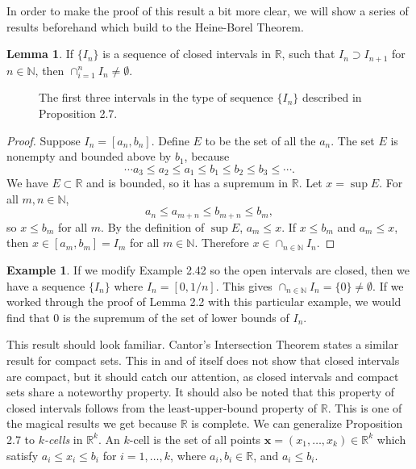 \documentclass{article}
\newcommand{\N}{\mathbb{N}}
\newcommand{\R}{\mathbb{R}}
\newcommand{\x}{\mathbf{x}}
\theoremstyle{definition}
\newtheorem{lemma}{Lemma}[section]
\newtheorem{example}{Example}[section]
\begin{document}
In order to make the proof of this result a bit more clear, we will show a series of results beforehand which build to the Heine-Borel Theorem.
\begin{lemma}
	If $ \{I_n\} $ is a sequence of closed intervals in $ \R $, such that $ I_n\supset I_{n+1} $  for $ n\in\N $, then $ \cap_{i=1}^n I_n\neq\emptyset$.
\end{lemma}  
		\begin{figure}[h]
	\centering
	\caption{The first three intervals in the type of sequence $ \{I_n\} $ described in Proposition 2.7.}
\end{figure}
\begin{proof}
	Suppose $ I_n=[a_n,b_n] $. Define $ E $ to be the set of all the $ a_n $. The set $ E $ is nonempty and bounded above by $ b_1 $, because $$\cdots a_3\le a_2\le a_1\le b_1\le b_2\le b_3\le \cdots .$$ We have $ E\subset \R $ and is bounded, so it has a supremum in $ \R $. Let $ x=\sup E $. For all $ m,n\in\N $, $$a_n\le a_{m+n}\le b_{m+n}\le b_m ,$$ so $ x\le b_m $ for all $ m $. By the definition of $ \sup E $, $ a_m\le x $. If $ x\le b_m $ and $ a_m\le x $, then $ x\in[a_m,b_m]=I_m $ for all $ m\in\N $. Therefore $ x\in\cap_{n\in\N} I_n $.
\end{proof}
\begin{example}
	If we modify Example 2.42 so the open intervals are closed, then we have a sequence $ \{I_n\} $ where $ I_n=[0,1/n] $. This gives $ \cap_{n\in\N} I_n=\{0\}\neq\emptyset $. If we worked through the proof of Lemma 2.2 with this particular example, we would find that $ 0 $ is the supremum of the set of lower bounds of $ I_n $. 
\end{example}
This result should look familiar. Cantor's Intersection Theorem states a similar result for compact sets. This in and of itself does not show that closed intervals are compact, but it should catch our attention, as closed intervals and compact sets share a noteworthy property. It should also be noted that this property of closed intervals follows from the least-upper-bound property of $ \R $. This is one of the magical results we get because $ \R $ is complete.  We can generalize Proposition 2.7 to \textit{\color{red}$ k $-cells} in $ \R^k $. An  $ k $-cell is the set of all points $ \x=(x_1,\ldots,x_k)\in\R^k $ which satisfy $ a_i\le x_i\le b_i $ for $ i=1,\ldots,k $, where $ a_i,b_i\in\R $, and $ a_i\le b_i $. 
\end{document}
